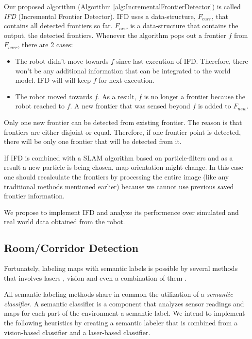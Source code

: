 \documentclass[a4paper,10pt]{article}
\begin{document}
Our proposed algorithm (Algorithm \ref{alg:IncrementalFrontierDetector}) is
called \emph{IFD} (Incremental Frontier Detector). IFD uses a
data-structure, $F_{curr}$, that contains all detected frontiers so far.
$F_{new}$ is a data-structure that contains the output, the detected frontiers.
Whenever the algorithm pops out a frontier $f$ from $F_{curr}$, there are 2 cases:
\begin{itemize}
	\item The robot didn't move towards $f$ since last execution of IFD. Therefore,
	there won't be any additional information that can be integrated to the world
	model. IFD will will keep $f$ for next execution.
	\item The robot moved towards $f$. As a result, $f$ is no longer a frontier
	because the robot reached to $f$. A new frontier that was sensed beyond $f$ is
	added to $F_{new}$.
\end{itemize}
Only one new frontier can be detected from existing frontier. The reason is that
frontiers are either disjoint or equal. Therefore, if one frontier point is
detected, there will be only one frontier that will be detected from it. 

If IFD is combined with a SLAM algorithm based on particle-filters and as a
result a new particle is being chosen, map orientation might change. In this
case one should recalculate the frontiers by processing the entire image (like
any traditional methods mentioned earlier) because we cannot use previous
saved frontier information. 

We propose to implement IFD and analyze its performence over simulated and real
world data obtained from the robot.


\subsection{Room/Corridor Detection}

Fortunately, labeling maps with semantic labels is possible by several
methods that involves lasers \cite{martinez2005icra, stachniss_speeding-up_2006,
mozos_semantic_2006}, vision \cite{ranganathan_semantic_2007} and even a combination of them
\cite{pronobis_multi-modal_2010, douillard_classification_????}.

All semantic labeling methods share in common the utilization of a
\emph{semantic classifier}. A semantic classifier is a component that analyzes
sensor readings and maps for each part of the environment a semantic label. We
intend to implement the following heuristics by creating a semantic labeler 
that is combined from a vision-based classifier and a laser-based classifier.
\end{document}

